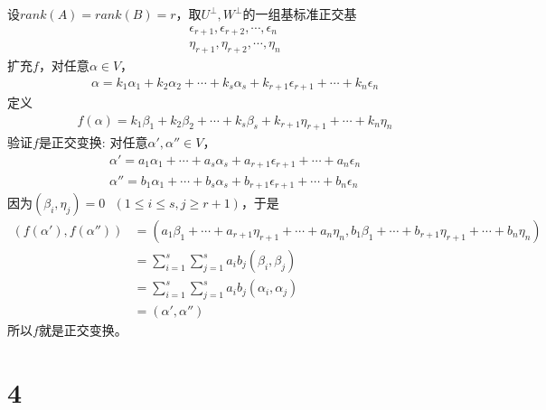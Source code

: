 \documentclass{article}
\begin{document}
\begin{itemize}
        设$rank(A) = rank(B) = r$，取$U^{\bot}, W^{\bot}$的一组基标准正交基
        \begin{align*}
          \epsilon_{r + 1}, \epsilon_{r + 2}, \cdots, \epsilon_{n} \\
          \eta_{r + 1}, \eta_{r + 2}, \cdots, \eta_{n}
        \end{align*}
        扩充$f$，对任意$\alpha \in V$，
        \begin{align*}
          \alpha = k_1 \alpha_1 + k_2 \alpha_2 + \cdots + k_s \alpha_s + k_{r + 1} \epsilon_{r + 1} + \cdots + k_n \epsilon_n
        \end{align*}
        定义
        \begin{align*}
          f(\alpha) = k_1 \beta_1 + k_2 \beta_2 + \cdots + k_s \beta_s + k_{r + 1} \eta_{r + 1} + \cdots + k_n \eta_n
        \end{align*}
        验证$f$是正交变换:
        对任意$\alpha', \alpha'' \in V$，
        \begin{align*}
          \alpha' = a_1 \alpha_1 + \cdots + a_s \alpha_s + a_{r + 1} \epsilon_{r + 1} + \cdots + a_n \epsilon_n \\
          \alpha'' = b_1 \alpha_1 + \cdots + b_s \alpha_s + b_{r + 1} \epsilon_{r + 1} + \cdots + b_n \epsilon_n
        \end{align*}
        因为$(\beta_i, \eta_j) = 0 \ \ \ (1 \leq i \leq s, j \geq r + 1)$，于是
        \begin{align*}
          (f(\alpha'), f(\alpha''))
           & = (a_1 \beta_1 + \cdots + a_{r + 1} \eta_{r + 1} + \cdots + a_n \eta_n, b_1 \beta_1 + \cdots + b_{r + 1} \eta_{r + 1} + \cdots + b_n \eta_n) \\
           & = \sum\limits_{i = 1}^s \sum\limits_{j = 1}^s a_i b_j (\beta_i, \beta_j)                                                                     \\
           & = \sum\limits_{i = 1}^s \sum\limits_{j = 1}^s a_i b_j (\alpha_i, \alpha_j)                                                                   \\
           & = (\alpha', \alpha'')
        \end{align*}
        所以$f$就是正交变换。
\end{itemize}

\section*{4}
\end{document}
